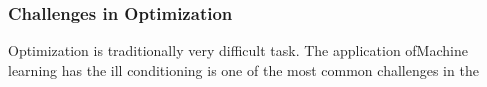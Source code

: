 \subsubsection{Challenges in Optimization}

Optimization is traditionally very difficult task. The application ofMachine learning has 
the ill conditioning is one of the most common challenges in the 
